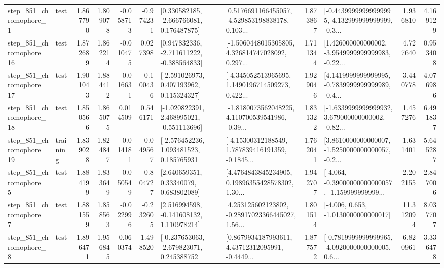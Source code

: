 \begin{tabular}{llrrrrllrlrr}
   step\_851\_chromophore\_1 &      test &      1.867790 &    1.809078 &     -0.058713 & -0.974231 &    [0.330582185, -2.666766081, 0.176487875] &  [0.5176691166455057, -4.529853198838178, 0.103... &       1.873867 &  [-0.44399999999999995, 4.132999999999999, -0.3... &            1.936810 &          4.169129 \\
  step\_851\_chromophore\_16 &      test &      1.872689 &    1.862214 &     -0.010475 &  0.027398 &   [0.947832336, -2.711611222, -0.388564833] &  [-1.5060448015305805, 4.326814747028092, 0.297... &       1.711344 &  [1.426000000000002, -3.9549999999999983, -0.22... &            4.727640 &          0.953408 \\
  step\_851\_chromophore\_17 &      test &      1.901043 &    1.884412 &     -0.016631 & -0.100436 &    [-2.591026973, 0.407193962, 0.115324327] &  [-4.345052513965695, 1.1490196714509273, 0.422... &       1.929046 &  [4.1419999999999995, -0.7839999999999989, -0.4... &            3.440778 &          4.076986 \\
  step\_851\_chromophore\_18 &      test &      1.850566 &    1.865075 &      0.014509 &  0.546171 &   [-1.020822391, 2.468995021, -0.551113696] &  [-1.8180073562048225, 4.110700539541986, -0.39... &       1.831322 &  [-1.6339999999999932, 3.679000000000002, -0.82... &            1.457276 &          6.491837 \\
  step\_851\_chromophore\_19 &  training &      1.839028 &    1.824847 &     -0.014181 & -0.049567 &    [-2.576452236, 1.093481523, 0.185765931] &  [-4.15300312188549, 1.787839416191359, -0.1845... &       1.762041 &  [3.8610000000000007, -1.5250000000000057, -0.2... &            1.631401 &          5.645287 \\
   step\_851\_chromophore\_5 &      test &      1.884199 &    1.833649 &     -0.050549 & -0.804727 &      [2.640659351, 0.33340079, 0.683802089] &  [4.4764843845234905, 0.19896355428578302, 1.30... &       1.942707 &  [-4.064, -0.39000000000000057, -1.159999999999... &            2.202155 &          2.847006 \\
   step\_851\_chromophore\_7 &      test &      1.881559 &    1.858563 &     -0.022996 & -0.232605 &    [2.516994598, -0.141608132, 1.110978214] &  [4.253125602123802, -0.28917023366445027, 1.56... &       1.801514 &               [-4.006, 0.653, -1.0130000000000017] &           11.312094 &          8.037707 \\
   step\_851\_chromophore\_8 &      test &      1.896471 &    1.956845 &      0.060374 &  1.498520 &   [-0.237653063, -2.679823071, 0.245388752] &  [0.8679934187993611, 4.43712312095991, -0.4449... &       1.877572 &  [-0.7819999999999965, -4.0920000000000005, 0.6... &            6.820961 &          3.336478 \\

\end{tabular}
